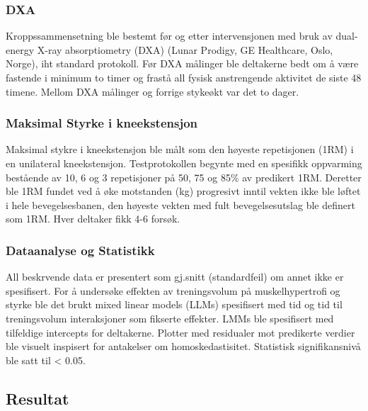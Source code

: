 \documentclass[
  letterpaper,
  DIV=11,
  numbers=noendperiod]{scrartcl}
\begin{document}
\hypertarget{dxa}{%
\subsubsection{DXA}\label{dxa}}

Kroppssammensetning ble bestemt før og etter intervensjonen med bruk av
dual-energy X-ray absorptiometry (DXA) (Lunar Prodigy, GE Healthcare,
Oslo, Norge), iht standard protokoll. Før DXA målinger ble deltakerne
bedt om å være fastende i minimum to timer og frastå all fysisk
anstrengende aktivitet de siste 48 timene. Mellom DXA målinger og
forrige stykeøkt var det to dager.

\hypertarget{maksimal-styrke-i-kneekstensjon}{%
\subsubsection{Maksimal Styrke i
kneekstensjon}\label{maksimal-styrke-i-kneekstensjon}}

Maksimal stykre i kneekstensjon ble målt som den høyeste repetisjonen
(1RM) i en unilateral kneekstensjon. Testprotokollen begynte med en
spesifikk oppvarming bestående av 10, 6 og 3 repetisjoner på 50, 75 og
85\% av predikert 1RM. Deretter ble 1RM fundet ved å øke motstanden (kg)
progresivt inntil vekten ikke ble løftet i hele bevegelsesbanen, den
høyeste vekten med fult bevegelsesutslag ble definert som 1RM. Hver
deltaker fikk 4-6 forsøk.

\hypertarget{dataanalyse-og-statistikk}{%
\subsubsection{Dataanalyse og
Statistikk}\label{dataanalyse-og-statistikk}}

All beskrvende data er presentert som gj.snitt (standardfeil) om annet
ikke er spesifisert. For å undersøke effekten av treningsvolum på
muskelhypertrofi og styrke ble det brukt mixed linear models (LLMs)
spesifisert med tid og tid til treningsvolum interaksjoner som fikserte
effekter. LMMs ble spesifisert med tilfeldige intercepts for deltakerne.
Plotter med residualer mot predikerte verdier ble visuelt inspisert for
antakelser om homoskedastisitet. Statistisk signifikansnivå ble satt til
\textless{} 0.05.

\hypertarget{resultat}{%
\subsection{Resultat}\label{resultat}}
\end{document}
